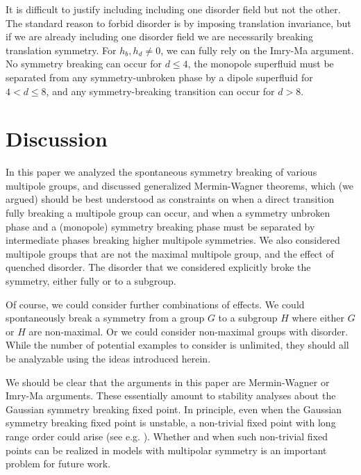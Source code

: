\documentclass[pra,aps,twocolumn, amsfonts,amsmath,amssymb,nofootinbib,superscriptaddress]{revtex4}
\begin{document}
It is difficult to justify including including one disorder field but not the other. The standard reason to forbid disorder is by imposing translation invariance, but if we are already including one disorder field we are necessarily breaking translation symmetry. For $h_b,h_d\ne 0$, we can fully rely on the Imry-Ma argument. No symmetry breaking can occur for $d\le 4$, the monopole superfluid must be separated from any symmetry-unbroken phase by a dipole superfluid for $4<d\le 8$, and any symmetry-breaking transition can occur for $d>8$. 

\section{Discussion} \label{sec:disc}

In this paper we analyzed the spontaneous symmetry breaking of various multipole groups, and discussed generalized Mermin-Wagner theorems, which (we argued) should be best understood as constraints on when a direct transition fully breaking a multipole group can occur, and when a symmetry unbroken phase and a (monopole) symmetry breaking phase must be separated by intermediate phases breaking higher multipole symmetries. We also considered multipole groups that are not the maximal multipole group, and the effect of quenched disorder. The disorder that we considered explicitly broke the symmetry, either fully or to a subgroup.

Of course, we could consider further combinations of effects. We could spontaneously break a symmetry from a group $G$ to a subgroup $H$ where either $G$ or $H$ are non-maximal. Or we could consider non-maximal groups with disorder. While the number of potential examples to consider is unlimited, they should all be analyzable using the ideas introduced herein. 

We should be clear that the arguments in this paper are Mermin-Wagner or Imry-Ma arguments. These essentially amount to stability analyses about the Gaussian symmetry breaking fixed point. In principle, even when the Gaussian symmetry breaking fixed point is unstable, a non-trivial fixed point with long range order could arise (see e.g. \cite{TonerRadzihovsky}). Whether and when such non-trivial fixed points can be realized in models with multipolar symmetry is an important problem for future work. 
\end{document}
